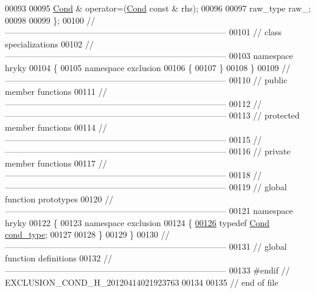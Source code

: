 \begin{DoxyCode}
00093 
00095     \hyperlink{classhryky_1_1exclusion_1_1_cond}{Cond} & operator=(\hyperlink{classhryky_1_1exclusion_1_1_cond}{Cond} \textcolor{keyword}{const} & rhs);
00096 
00097     raw\_type    raw\_;
00098 
00099 \};
00100 \textcolor{comment}{//
      ------------------------------------------------------------------------------}
00101 \textcolor{comment}{// class specializations}
00102 \textcolor{comment}{//
      ------------------------------------------------------------------------------}
00103 \textcolor{keyword}{namespace }hryky
00104 \{
00105 \textcolor{keyword}{namespace }exclusion
00106 \{
00107 \}
00108 \}
00109 \textcolor{comment}{//
      ------------------------------------------------------------------------------}
00110 \textcolor{comment}{// public member functions}
00111 \textcolor{comment}{//
      ------------------------------------------------------------------------------}
00112 \textcolor{comment}{//
      ------------------------------------------------------------------------------}
00113 \textcolor{comment}{// protected member functions}
00114 \textcolor{comment}{//
      ------------------------------------------------------------------------------}
00115 \textcolor{comment}{//
      ------------------------------------------------------------------------------}
00116 \textcolor{comment}{// private member functions}
00117 \textcolor{comment}{//
      ------------------------------------------------------------------------------}
00118 \textcolor{comment}{//
      ------------------------------------------------------------------------------}
00119 \textcolor{comment}{// global function prototypes}
00120 \textcolor{comment}{//
      ------------------------------------------------------------------------------}
00121 \textcolor{keyword}{namespace }hryky
00122 \{
00123 \textcolor{keyword}{namespace }exclusion
00124 \{
\hypertarget{exclusion__cond_8h_source_l00126}{}\hyperlink{namespacehryky_1_1exclusion_ad55c6711217e878a379eed07ea146e3c}{00126}     \textcolor{keyword}{typedef} \hyperlink{classhryky_1_1exclusion_1_1_cond}{Cond} \hyperlink{namespacehryky_1_1exclusion_ad55c6711217e878a379eed07ea146e3c}{cond_type};
00127 
00128 \}
00129 \}
00130 \textcolor{comment}{//
      ------------------------------------------------------------------------------}
00131 \textcolor{comment}{// global function definitions}
00132 \textcolor{comment}{//
      ------------------------------------------------------------------------------}
00133 \textcolor{preprocessor}{#endif // EXCLUSION\_COND\_H\_20120414021923763}
00134 \textcolor{preprocessor}{}
00135 \textcolor{comment}{// end of file}
\end{DoxyCode}

